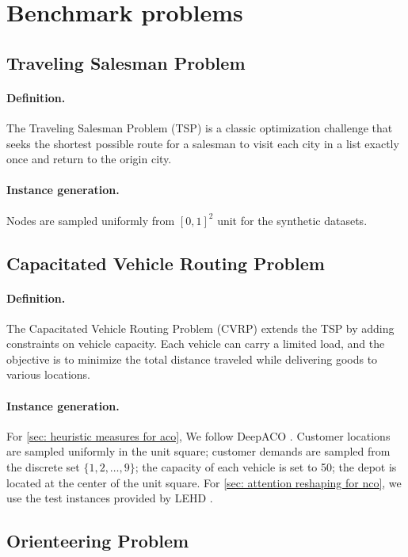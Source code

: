 \section{Benchmark problems}\label{app: benchmark problems}


\subsection{Traveling Salesman Problem}
\paragraph{Definition.}
The Traveling Salesman Problem (TSP) is a classic optimization challenge that seeks the shortest possible route for a salesman to visit each city in a list exactly once and return to the origin city.

\paragraph{Instance generation.}
Nodes are sampled uniformly from $[0,1]^2$ unit for the synthetic datasets.

\subsection{Capacitated Vehicle Routing Problem}
\paragraph{Definition.}
The Capacitated Vehicle Routing Problem (CVRP) extends the TSP by adding constraints on vehicle capacity. Each vehicle can carry a limited load, and the objective is to minimize the total distance traveled while delivering goods to various locations.

\paragraph{Instance generation.}
For \cref{sec: heuristic measures for aco}, We follow DeepACO \cite{ye2023deepaco}. Customer locations are sampled uniformly in the unit square; customer demands are sampled from the discrete set $\{1, 2, \ldots, 9\}$; the capacity of each vehicle is set to 50; the depot is located at the center of the unit square. For \cref{sec: attention reshaping for nco}, we use the test instances provided by LEHD \cite{luo2023nco_heavy_decoder}.


\subsection{Orienteering Problem}
